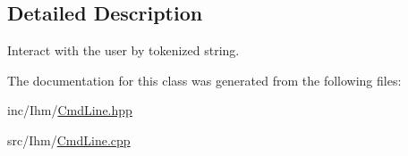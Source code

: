 \subsection{Detailed Description}
Interact with the user by tokenized string. 

The documentation for this class was generated from the following files\+:\begin{DoxyCompactItemize}
\item 
inc/\+Ihm/\hyperlink{CmdLine_8hpp}{Cmd\+Line.\+hpp}\item 
src/\+Ihm/\hyperlink{CmdLine_8cpp}{Cmd\+Line.\+cpp}\end{DoxyCompactItemize}
